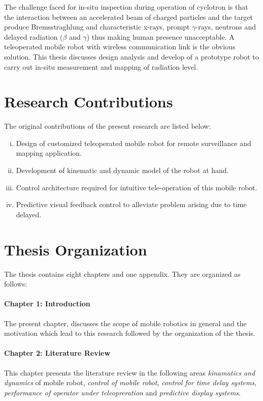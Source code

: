 The challenge faced for in-situ inspection during operation of cyclotron is that the interaction  between  an  accelerated  beam   of  charged  particles  and  the  target  produce Bremsstraghlung and characteristic x-rays, prompt $\gamma$-rays, neutrons and delayed radiation ($\beta $ and $\gamma$) thus making human presence unacceptable.  A teleoperated mobile robot with wireless communication link is the obvious solution. This thesis discusses design analysis and develop of a prototype robot  to carry out in-situ measurement and mapping of radiation level.

\section{Research Contributions}
The original contributions of the present research are listed below:
\begin{enumerate}[(i)]

\item Design of customized teleoperated mobile robot for remote surveillance and mapping application.
\item Development of kinematic and dynamic model of the robot at hand.
\item Control architecture required for intuitive tele-operation of this mobile robot.
\item Predictive visual feedback control to alleviate problem arising due to time delayed.


\end{enumerate}
\section{Thesis Organization}
The thesis contains eight chapters and one appendix. They are organized as follows:
\paragraph*{Chapter 1: Introduction\\}
The present chapter, discusses the scope of mobile robotics in general and the motivation which lead to this research followed by the organization of the thesis.
\paragraph*{Chapter 2: Literature Review\\}
This chapter presents the literature review in the following areas \textit{kinamatics and dynamics} of mobile robot, \textit{control of mobile robot}, \textit{control for time delay systems}, \textit{performance of operator under teleopreration}  and \textit{predictive display systems}.


